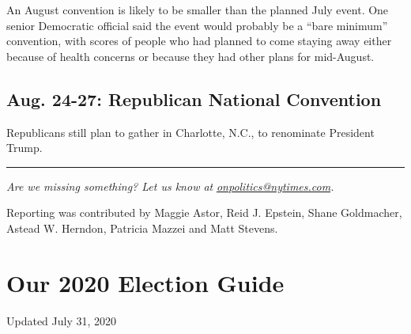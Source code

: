An August convention is likely to be smaller than the planned July
event. One senior Democratic official said the event would probably be a
``bare minimum'' convention, with scores of people who had planned to
come staying away either because of health concerns or because they had
other plans for mid-August.

\hypertarget{aug-24-27-republican-national-convention}{%
\subsection{Aug. 24-27: Republican National
Convention}\label{aug-24-27-republican-national-convention}}

Republicans still plan to gather in Charlotte, N.C., to renominate
President Trump.

\begin{center}\rule{0.5\linewidth}{\linethickness}\end{center}

\emph{Are we missing something? Let us know at}
\href{mailto:onpolitics@nytimes.com}{\emph{onpolitics@nytimes.com}}\emph{.}

Reporting was contributed by Maggie Astor, Reid J. Epstein, Shane
Goldmacher, Astead W. Herndon, Patricia Mazzei and Matt Stevens.

\hypertarget{our-2020-election-guide}{%
\section{Our 2020 Election Guide}\label{our-2020-election-guide}}

Updated July 31, 2020

